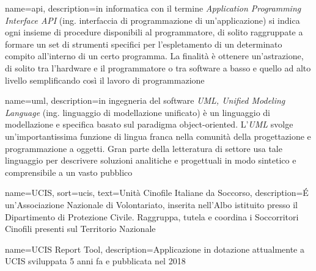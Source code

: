\makeglossaries
\renewcommand{\acronymname}{Acronimi e abbreviazioni}


\renewcommand{\glossaryname}{Glossario}

{
    name=api,
    description={in informatica con il termine \emph{Application Programming Interface API} (ing. interfaccia di programmazione di un'applicazione) si indica ogni insieme di procedure disponibili al programmatore, di solito raggruppate a formare un set di strumenti specifici per l'espletamento di un determinato compito all'interno di un certo programma. La finalità è ottenere un'astrazione, di solito tra l'hardware e il programmatore o tra software a basso e quello ad alto livello semplificando così il lavoro di programmazione}
}

{
    name=uml,
    description={in ingegneria del software \emph{UML, Unified Modeling Language} (ing. linguaggio di modellazione unificato) è un linguaggio di modellazione e specifica basato sul paradigma object-oriented. L'\emph{UML} svolge un'importantissima funzione di lingua franca nella comunità della progettazione e programmazione a oggetti. Gran parte della letteratura di settore usa tale linguaggio per descrivere soluzioni analitiche e progettuali in modo sintetico e comprensibile a un vasto pubblico}
}

{
    name=UCIS,
    sort=ucis,
    text=Unità Cinofile Italiane da Soccorso,
    description={É un'Associazione Nazionale di Volontariato, inserita nell'Albo istituito presso il Dipartimento di Protezione Civile. Raggruppa, tutela e coordina i Soccorritori Cinofili presenti sul Territorio Nazionale}
}

{
  name=UCIS Report Tool,
  description={Applicazione in dotazione attualmente a UCIS sviluppata 5 anni fa e pubblicata nel 2018}
}

